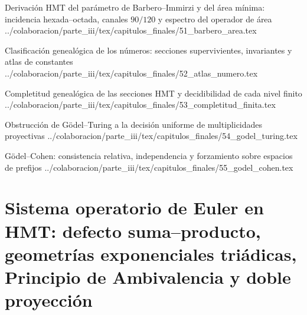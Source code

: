 \HMTFlushCurrentChapter
\HMTSuccessorChapterInput
  {Derivación HMT del parámetro de Barbero--Immirzi y del área mínima: incidencia hexada--octada, canales \(90/120\) y espectro del operador de área}
  {../colaboracion/parte_iii/tex/capitulos_finales/51_barbero_area.tex}


\HMTFlushCurrentChapter


\HMTFlushCurrentChapter
\HMTSuccessorChapterInput
  {Clasificación genealógica de los números: secciones supervivientes, invariantes y atlas de constantes}
  {../colaboracion/parte_iii/tex/capitulos_finales/52_atlas_numero.tex}

\HMTFlushCurrentChapter
\HMTSuccessorChapterInput
  {Completitud genealógica de las secciones HMT y decidibilidad de cada nivel finito}
  {../colaboracion/parte_iii/tex/capitulos_finales/53_completitud_finita.tex}

\HMTFlushCurrentChapter
\HMTSuccessorChapterInput
  {Obstrucción de Gödel--Turing a la decisión uniforme de multiplicidades proyectivas}
  {../colaboracion/parte_iii/tex/capitulos_finales/54_godel_turing.tex}

\HMTFlushCurrentChapter
\HMTSuccessorChapterInput
  {Gödel--Cohen: consistencia relativa, independencia y forzamiento sobre espacios de prefijos}
  {../colaboracion/parte_iii/tex/capitulos_finales/55_godel_cohen.tex}

\HMTFlushCurrentChapter
\chapter{Sistema operatorio de Euler en HMT: defecto suma--producto, geometrías exponenciales triádicas, Principio de Ambivalencia y doble proyección}


\let\HMTSuccessorChapterInput\relax










\HMTFlushCurrentChapter
